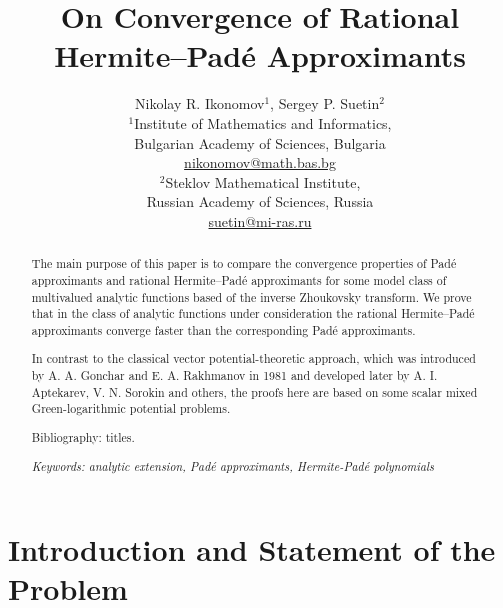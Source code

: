 \documentclass[11pt, a4paper, twoside]{article}
\def\[{\left[}
\theoremstyle{plain}
\theoremstyle{definition}
\begin{document}
\title{\Large\bfseries On Convergence of Rational Hermite--Padé Approximants}

\author{Nikolay R. Ikonomov${}^1$, Sergey P. Suetin${}^2$\\[2mm]
\normalsize ${}^1$Institute of Mathematics and Informatics,\\
\normalsize Bulgarian Academy of Sciences, Bulgaria\\
\normalsize \href{mailto:nikonomov@math.bas.bg}{nikonomov@math.bas.bg}\\[2mm]
\normalsize ${}^2$Steklov Mathematical Institute,\\
\normalsize Russian Academy of Sciences, Russia\\
\normalsize \href{mailto:suetin@mi-ras.ru}{suetin@mi-ras.ru}}

\date{ }
\maketitle


\begin{abstract}
The main purpose of this paper is to compare the convergence properties of Padé approximants and rational Hermite--Padé approximants for some model class of multivalued analytic functions based of the inverse Zhoukovsky transform. We prove that in the class of analytic functions under consideration the rational Hermite--Padé approximants converge faster than the corresponding Padé approximants.

In contrast  to the classical vector potential-theoretic approach, which was introduced by A. A. Gonchar and E. A. Rakhmanov in 1981 and developed later by A. I. Aptekarev, V. N. Sorokin and others, the proofs here are based on some scalar mixed Green-logarithmic potential problems.

Bibliography: \cite{Tre23} titles.

\medskip
{\sl Keywords: analytic extension, Padé approximants, Hermite-Padé polynomials}
\end{abstract}



\section{Introduction and Statement of the Problem}\label{s1}
\end{document}
